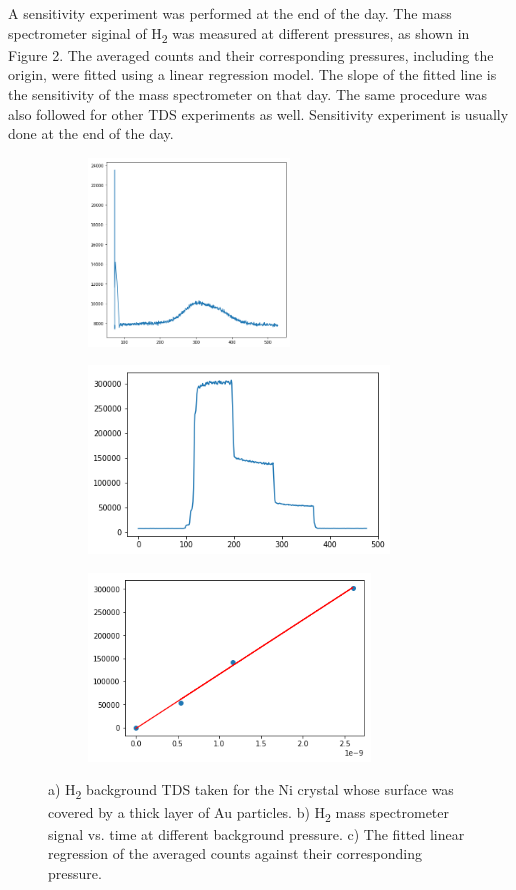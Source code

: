 \documentclass{article}
\begin{document}
A sensitivity experiment was performed at the end of the day. The mass
spectrometer siginal of H\textsubscript{2} was measured at different pressures,
as shown in Figure 2. The averaged counts and their corresponding pressures,
including the origin, were fitted using a linear regression model. The slope of
the fitted line is the sensitivity of the mass spectrometer on that day. The
same procedure was also followed for other TDS experiments as well. Sensitivity
experiment is usually done at the end of the day.

\begin{figure}[h]
\begin{subfigure}{0.5\textwidth}
\includegraphics[width=0.9\linewidth, height=5cm]{background_tds.png}
\caption{}
\label{fig:subim1-a}
\end{subfigure}
\begin{subfigure}{0.5\textwidth}
\includegraphics[width=0.9\linewidth, height=5cm]{sensitivity.png}
\caption{}
\label{fig:subim1-b}
\end{subfigure}
\begin{subfigure}{0.5\textwidth}
\includegraphics[width=0.9\linewidth, height=5cm]{sensitivity_regression.png}
\caption{}
\label{fig:subim1-c}
\end{subfigure}
\caption{a) H\textsubscript{2} background TDS taken for the Ni crystal whose
    surface was covered by a thick layer of Au particles. b) H\textsubscript{2}
    mass spectrometer signal vs. time at different background pressure. c) The
    fitted linear regression of the averaged counts against their corresponding
    pressure.}
\label{fig:image1}
\end{figure}
\end{document}

